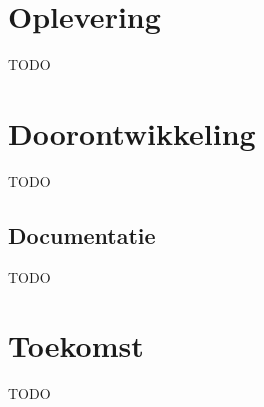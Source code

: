 \section{Oplevering}

{\par \bigskip \par \color{red} TODO \par \bigskip \par }

\section{Doorontwikkeling}

{\par \bigskip \par \color{red} TODO \par \bigskip \par }

\subsection{Documentatie}

{\par \bigskip \par \color{red} TODO \par \bigskip \par }

\section{Toekomst}

{\par \bigskip \par \color{red} TODO \par \bigskip \par }
